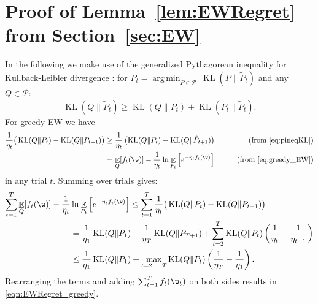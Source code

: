 \documentclass{colt2018} %
\DeclareMathOperator*{\E}{\mathbb{E}}
\DeclareMathOperator{\kl}{KL}
\DeclareMathOperator*{\argmin}{arg\,min}
\newcommand{\domainP}{\mathcal{P}}
\DeclareRobustCommand{\VAN}[3]{#2} %
\begin{document}
\DeclareRobustCommand{\VAN}[3]{#3} %


\DeclareRobustCommand{\VAN}[3]{#2} %








\appendix



\section{Proof of Lemma~\ref{lem:EWRegret} from Section~\ref{sec:EW}}
\label{sec:EWRegretProof}

In the following we make use of the generalized Pythagorean inequality
for Kullback-Leibler divergence \citep{Csiszar1975}:
for $P_{t} = \argmin_{P \in \domainP}~ \kl(P\|\tilde{P}_{t})$ and any $Q \in \domainP$:
\begin{equation}\label{eq:pineqKL}
\kl(Q\|\tilde{P}_t) \geq \kl(Q\|P_t) + \kl(P_t\|\tilde{P}_t).
\end{equation}
% 
For greedy EW we have
\begin{align*}
  \frac{1}{\eta_t} \big(\kl(Q\|P_t) - \kl(Q\|P_{t+1}) \big)
  & \geq \frac{1}{\eta_t} \left( \kl(Q\|P_t) - \kl(Q\|\tilde{P}_{t+1})\right) \qquad
    & \text{(from \eqref{eq:pineqKL})} \\
    & = \E_{Q}[f_t(\w)] - \frac{1}{\eta_t} \ln\E_{P_t}\Big[e^{-\eta_{t}f_t(\w)}\Big] \qquad
    & \text{(from \eqref{eq:greedy_EW})}
\end{align*}
% 
in any trial $t$. Summing over trials gives:
\begin{align*}
  \sum_{t=1}^T \E_{Q}[f_t(\w)] - \frac{1}{\eta_t} &\ln\E_{P_t}\Big[e^{-\eta_{t}f_t(\w)}\Big]
\leq \sum_{t=1}^T \frac{1}{\eta_t} \big(\kl(Q\|P_t) - \kl(Q\|P_{t+1}) \big) \\
&= \frac{1}{\eta_1} \kl(Q\|P_1)
- \frac{1}{\eta_T} \kl(Q\|P_{T+1}) +
\sum_{t=2}^T \kl(Q\|P_t) \left(\frac{1}{\eta_t}-\frac{1}{\eta_{t-1}}\right) \\
&\leq \frac{1}{\eta_1} \kl(Q\|P_1) + \max_{t=2,\ldots,T} \kl(Q\|P_t) 
\left(\frac{1}{\eta_T}-\frac{1}{\eta_1}\right).
\end{align*}
Rearranging the terms and adding $\sum_{t=1}^T f_t(\w_t)$ on both sides results
in \eqref{eqn:EWRegret_greedy}.
\end{document}
